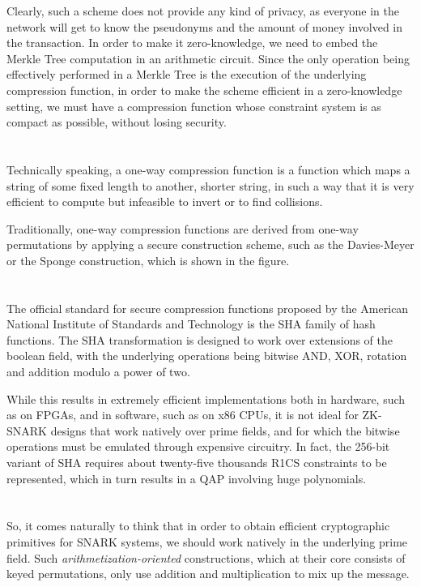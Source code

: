 \documentclass{article}
\begin{document}
Clearly, such a scheme does not provide any kind of privacy, as everyone in the network will get to 
know the pseudonyms and the amount of money involved in the transaction.
In order to make it zero-knowledge, we need to embed the Merkle Tree computation in an arithmetic 
circuit.
Since the only operation being effectively performed in a Merkle Tree is the execution of the 
underlying compression function, in order to make the scheme efficient in a zero-knowledge setting,
we must have a compression function whose constraint system is as compact as possible, without 
losing security.

\section{}
Technically speaking, a one-way compression function is a function which maps a string of 
some fixed length to another, shorter string, in such a way that it is very efficient to compute 
but infeasible to invert or to find collisions.

Traditionally, one-way compression functions are derived from one-way permutations by applying a 
secure construction scheme, such as the Davies-Meyer or the Sponge construction, which is 
shown in the figure.

\section{}
The official standard for secure compression functions proposed by the American National Institute 
of Standards and Technology is the SHA family of hash functions.
The SHA transformation is designed to work over extensions of the boolean field, with the 
underlying operations being bitwise AND, XOR, rotation and addition modulo a power of two.

While this results in extremely efficient implementations both in hardware, such as on FPGAs,
and in software, such as on x86 CPUs, it is not ideal for ZK-SNARK designs that work natively over 
prime fields, and for which the bitwise operations must be emulated through expensive circuitry.
In fact, the 256-bit variant of SHA requires about twenty-five thousands R1CS constraints to be 
represented, which in turn results in a QAP involving huge polynomials.

\section{}
So, it comes naturally to think that in order to obtain efficient cryptographic primitives for 
SNARK systems, we should work natively in the underlying prime field.
Such \emph{arithmetization-oriented} constructions, which at their core consists of keyed 
permutations, only use addition and multiplication to mix up the message. 
\end{document}

